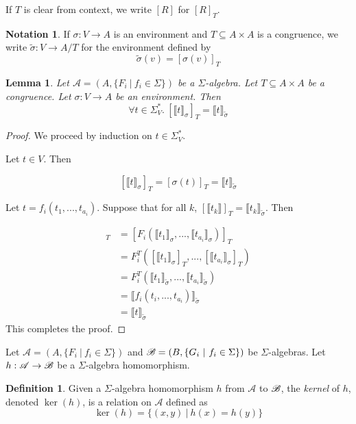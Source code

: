 \documentclass{msthesis}
\newtheorem{lemma}[theorem]{Lemma}
\theoremstyle{definition}
\newtheorem{definition}[theorem]{Definition}
\newtheorem*{notation}{Notation}
\newcommand{\semof}[1]{\llbracket{#1}\rrbracket}
\newcommand{\Amod}{\mathscr{A}}
\begin{document}
If $T$ is clear from context, we write $[R]$ for $[R]_T$.

\begin{notation}
    If $\sigma : V \to A$ is an environment and $T \subseteq A \times A$ is a congruence, we write $\tilde{\sigma} : V \to A/T$ for the environment defined by
    \[ \tilde{\sigma}(v) = [\sigma(v)]_T\]
\end{notation}

\begin{lemma}\label{lemma:quotient_environments}
    Let $\Amod = (A, \{F_i\ |\ f_i \in \Sigma\})$ be a $\Sigma$-algebra. Let $T \subseteq A \times A$ be a congruence.  Let $\sigma : V \to A$ be an environment.  Then
    \[ \forall t \in \Sigma^*_V.\ [\semof{t}_\sigma]_T =\semof{t}_{\tilde{\sigma}} \]
\end{lemma}

\begin{proof}
    We proceed by induction on $t \in \Sigma^*_V$.

    Let $t \in V$. Then

    \[ [\semof{t}_\sigma]_T = [\sigma(t)]_T = \semof{t}_{\tilde{\sigma}}\]

    Let $t = f_i(t_1, ..., t_{a_i})$. Suppose that for all $k$, $[\semof{t_k}]_T = \semof{t_k}_{\tilde{\sigma}}$.  Then

    \begin{align*}
        [\semof{t}_\sigma]_T &= [F_i(\semof{t_1}_\sigma, ..., \semof{t_{a_i}}_\sigma)]_T \\
        &= F^T_i([\semof{t_1}_\sigma]_T, ..., [\semof{t_{a_i}}_\sigma]_T) \\
        &= F^T_i(\semof{t_1}_{\tilde{\sigma}}, ..., \semof{t_{a_i}}_{\tilde{\sigma}}) \\
        &= \semof{f_i(t_i, ..., t_{a_i})}_{\tilde{\sigma}} \\
        &= \semof{t}_{\tilde{\sigma}} 
    \end{align*}
This completes the proof.
\end{proof}

Let $\Amod = (A, \{F_i\ |\ f_i \in \Sigma\})$ and $\mathscr{B} = (B, \{ G_i\ |\ f_i \in \Sigma\})$ be $\Sigma$-algebras.  Let $h : \Amod \to \Bmod$ be a $\Sigma$-algebra homomorphism. 

\begin{definition}
    Given a $\Sigma$-algebra homomorphism $h$ from $\Amod$ to $\mathscr{B}$, the \emph{kernel} of $h$, denoted $\ker(h)$, is a relation on $\Amod$ defined as
    \[ \ker(h) = \{(x, y)\ |\ h(x) = h(y)\} \]
\end{definition}
\end{document}
